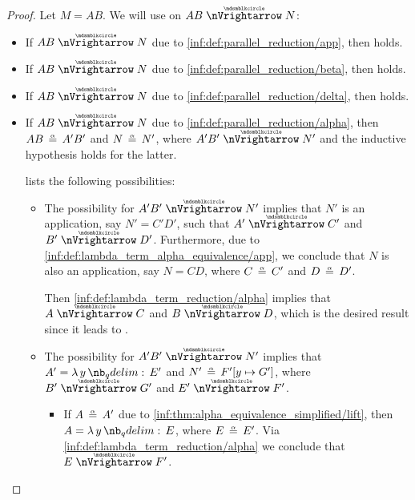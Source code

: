 \begin{proof}
   Let \( M = AB \). We will use  on \( AB \ppred N \):
  \begin{itemize}
    \item If \( AB \ppred N \) due to \ref{inf:def:parallel_reduction/app}, then  holds.

    \item If \( AB \ppred N \) due to \ref{inf:def:parallel_reduction/beta}, then  holds.

    \item If \( AB \ppred N \) due to \ref{inf:def:parallel_reduction/delta}, then  holds.

    \item If \( AB \ppred N \) due to \ref{inf:def:parallel_reduction/alpha}, then \( AB \aequiv A' B' \) and \( N \aequiv N' \), where \( A' B' \ppred N' \) and the inductive hypothesis holds for the latter.

     lists the following possibilities:
    \begin{itemize}
      \item The possibility  for \( A' B' \ppred N' \) implies that \( N' \) is an application, say \( N' = C' D' \), such that \( A' \ppred C' \) and \( B' \ppred D' \). Furthermore, due to \ref{inf:def:lambda_term_alpha_equivalence/app}, we conclude that \( N \) is also an application, say \( N = CD \), where \( C \aequiv C' \) and \( D \aequiv D' \).

      Then \ref{inf:def:lambda_term_reduction/alpha} implies that \( A \ppred C \) and \( B \ppred D \), which is the desired result since it leads to .

      \item The possibility  for \( A' B' \ppred N' \) implies that \( A' = \qabs y E' \) and \( N' \aequiv F'[y \mapsto G'] \), where \( B' \ppred G' \) and \( E' \ppred F' \).

      \begin{itemize}
        \item If \( A \aequiv A' \) due to \ref{inf:thm:alpha_equivalence_simplified/lift}, then \( A = \qabs y E \), where \( E \aequiv E' \). Via \ref{inf:def:lambda_term_reduction/alpha} we conclude that \( E \ppred F' \).


\end{itemize}
\end{itemize}
\end{itemize}
\end{proof}
